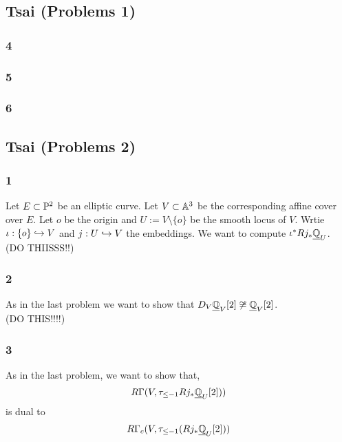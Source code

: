 \documentclass[12pt]{article}
\begin{document}
\subsection{Tsai (Problems 1)}

\subsubsection*{4}

\subsubsection*{5}

\subsubsection*{6}

\subsection{Tsai (Problems 2)}

\subsubsection*{1}

Let $E \subset \P^2$ be an elliptic curve. Let $V \subset \A^3$ be the corresponding affine cover over $E$. Let $o$ be the origin and $U := V \setminus \{ o \}$ be the smooth locus of $V$. Wrtie $\iota : \{ o \} \embed V$ and $j : U \embed V$ the embeddings. We want to compute $\iota^* R j_* \underline{\Q}_U$.
\bigskip\\
(DO THIISSS!!)

\subsubsection*{2}

As in the last problem we want to show that $D_V \underline{\Q}_V[2] \not\cong \underline{\Q}_V[2]$.
\bigskip\\
(DO THIS!!!!)

\subsubsection*{3}

As in the last problem, we want to show that,
\[ R\Gamma(V, \tau_{\le -1} R j_* \underline{\Q}_U[2])) \]
is dual to
\[ R \Gamma_c(V, \tau_{\le -1}(Rj_* \underline{\Q}_U[2])) \]
\end{document}
